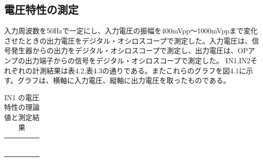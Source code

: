 \documentclass{jlreq}
\numberwithin{equation}{section}
\begin{document}
\subsection{電圧特性の測定}
入力周波数を50Hzで一定にし、入力電圧の振幅を400mVpp〜1000mVppまで変化させたときの出力電圧をデジタル・オシロスコープで測定した。入力電圧は、信号発生器からの出力をデジタル・オシロスコープで測定し、出力電圧は、OPアンプの出力端子からの信号をデジタル・オシロスコープで測定した。
IN1,IN2それぞれの計測結果は表4.2,表4.3の通りである。またこれらのグラフを図4.1に示す。グラフは、横軸に入力電圧、縦軸に出力電圧を取ったものである。

\begin{table}[H]
  \centering
  \caption{IN1 の電圧特性の理論値と測定結果}
  \begin{tabular}{|c|c|c|c|c|}
    \hline
      \color{blue}{入力電圧(理論値) [mVpp]} & \color{blue}{出力電圧(理論値) [mVpp]} & \color{blue}{入力電圧(実測値) [mVpp]} & \color{blue}{出力電圧(実測値) [mVpp]} \\ \hline
      \color{blue}{400} & \color{blue}{896} & \color{blue}{408} & \color{blue}{900} \\ \hline
      \color{blue}{500} & \color{blue}{1120} & \color{blue}{500} & \color{blue}{1120} \\ \hline
      \color{blue}{600} & \color{blue}{1344} & \color{blue}{600} & \color{blue}{1320} \\ \hline
      \color{blue}{700} & \color{blue}{1568} & \color{blue}{700} & \color{blue}{1600} \\ \hline
      \color{blue}{800} & \color{blue}{1792} & \color{blue}{800} & \color{blue}{1920} \\ \hline
      \color{blue}{900} & \color{blue}{2016} & \color{blue}{920} & \color{blue}{2160} \\ \hline
      \color{blue}{1000} & \color{blue}{2240} & \color{blue}{1060} & \color{blue}{2480} \\ \hline
  \end{tabular}
\end{table}
\end{document}
